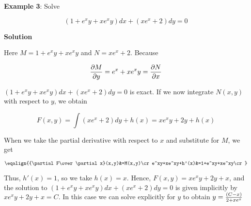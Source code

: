 \nopagenumbers
{\bf Example 3}: Solve

$$(1+e^xy+xe^xy)dx+(xe^x+2)dy=0$$

\vskip 10pt
{\bf Solution}

\vskip 6pt
Here $M=1+e^xy+xe^xy$ and $N=xe^x+2$. Because

$${\partial M\over\partial y}=e^x+xe^xy={\partial N\over\partial x}$$

$(1+e^xy+xe^xy)dx+(xe^x+2)dy=0$ is exact. If we now integrate $N(x,y)$ with respect to $y$, we obtain

$$F(x,y)=\int(xe^x+2)dy+h(x)=xe^xy+2y+h(x)$$

When we take the partial derivative with respect to $x$ and substitute for $M$, we get

$$\eqalign{{\partial F\over\partial x}(x,y)&=M(x,y)\cr
		e^xy+xe^xy+h'(x)&=1+e^xy+xe^xy\cr}$$

Thus, $h'(x)=1$, so we take $h(x)=x$. Hence, $F(x,y)=xe^xy+2y+x$, and the solution to $(1+e^xy+xe^xy)dx+(xe^x+2)dy=0$ is given implicitly by $xe^xy+2y+x=C$. In this case we can solve explicitly for $y$ to obtain $y={(C-x)\over 2+xe^x}$

\vfill\eject
\bye
